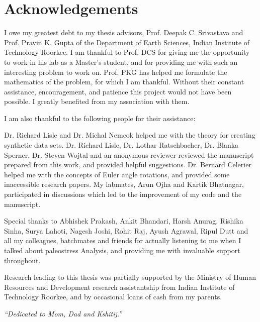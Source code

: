 \documentclass[12pt, oneside]{book}
\begin{document}
\clearpage  %

\onehalfspacing
\chapter{Acknowledgements}
I owe my greatest debt to my thesis advisors, Prof. Deepak C. Srivastava and Prof. Pravin K. Gupta of the Department of Earth Sciences, Indian Institute of Technology Roorkee. I am thankful to Prof. DCS for giving me the opportunity to work in his lab as a Master's student, and for providing me with such an interesting problem to work on. Prof. PKG has helped me formulate the mathematics of the problem, for which I am thankful. Without their constant assistance, encouragement, and patience this project would not have been possible. I greatly benefited from my association with them.

I am also thankful to the following people for their assistance:

Dr. Richard Lisle and Dr. Michal Nemcok helped me with the theory for creating synthetic data sets. Dr. Richard Lisle,  Dr. Lothar Ratschbacher, Dr. Blanka Sperner, Dr. Steven Wojtal and an anonymous reviewer reviewed the manuscript prepared from this work, and provided helpful suggestions. Dr. Bernard Celerier helped me with the concepts of Euler angle rotations, and provided some inaccessible research papers. My labmates, Arun Ojha and Kartik Bhatnagar, participated in discussions which led to the improvement of my code and the manuscript. 

Special thanks to Abhishek Prakash, Ankit Bhandari, Harsh Anurag, Rishika Sinha, Surya Lahoti, Nagesh Joshi, Rohit Raj, Ayush Agrawal, Ripul Dutt and all my colleagues, batchmates and friends for actually listening to me when I talked about paleostress Analysis, and providing me with invaluable support throughout.

Research leading to this thesis was partially supported by the Ministry of Human Resources and Development research assistantship from Indian Institute of Technology Roorkee, and by occasional loans of cash from my parents.

\clearpage  %

\pagestyle{empty}  %

\null\vfill
\textit{``Dedicated to Mom, Dad and Kshitij.''}
\end{document}
